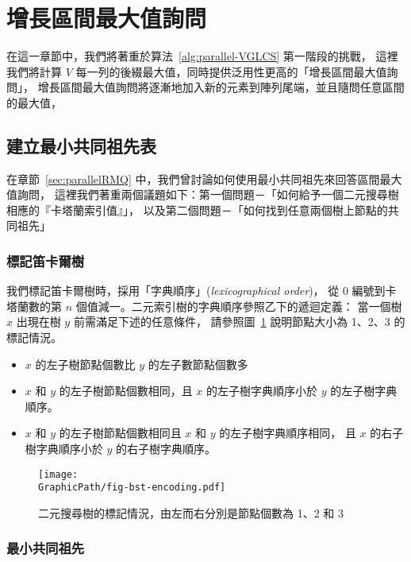 \section{增長區間最大值詢問} \label{sec:QIUD}

在這一章節中，我們將著重於算法~\ref{alg:parallel-VGLCS} 第一階段的挑戰，
這裡我們將計算 $V$ 每一列的後綴最大值，同時提供泛用性更高的「增長區間最大值詢問」，
增長區間最大值詢問將逐漸地加入新的元素到陣列尾端，並且隨問任意區間的最大值，

\subsection{建立最小共同祖先表}

在章節~\ref{sec:parallelRMQ} 中，我們曾討論如何使用最小共同祖先來回答區間最大值詢問，
這裡我們著重兩個議題如下：第一個問題－「如何給予一個二元搜尋樹相應的『卡塔蘭索引值』」，
以及第二個問題－「如何找到任意兩個樹上節點的共同祖先」

\subsubsection{標記笛卡爾樹}

我們標記笛卡爾樹時，採用「字典順序」({\em lexicographical order})，
從 $0$ 編號到卡塔蘭數的第 $n$ 個值減一。二元索引樹的字典順序參照乙下的遞迴定義：
當一個樹 $x$ 出現在樹 $y$ 前需滿足下述的任意條件，
請參照圖~\ref{fig:labelingBST} 說明節點大小為 1、2、3 的標記情況。

\begin{itemize}
\item $x$ 的左子樹節點個數比 $y$ 的左子數節點個數多
\item $x$ 和 $y$ 的左子樹節點個數相同，且 $x$ 的左子樹字典順序小於 $y$ 的左子樹字典順序。
\item $x$ 和 $y$ 的左子樹節點個數相同且 $x$ 和 $y$ 的左子樹字典順序相同，
  且 $x$ 的右子樹字典順序小於 $y$ 的右子樹字典順序。
\end{itemize}

\begin{figure}[!thb]
  \centering
  \texttt{[image: \\GraphicPath/fig-bst-encoding.pdf]}
  \caption{二元搜尋樹的標記情況，由左而右分別是節點個數為 1、2 和 3}
  \label{fig:labelingBST}
\end{figure}

\subsubsection{最小共同祖先}

